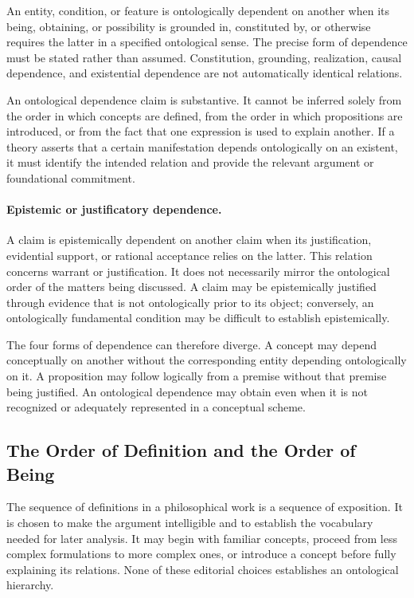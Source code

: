 An entity, condition, or feature is ontologically dependent on another
when its being, obtaining, or possibility is grounded in, constituted
by, or otherwise requires the latter in a specified ontological sense.
The precise form of dependence must be stated rather than assumed.
Constitution, grounding, realization, causal dependence, and
existential dependence are not automatically identical relations.

An ontological dependence claim is substantive. It cannot be inferred
solely from the order in which concepts are defined, from the order in
which propositions are introduced, or from the fact that one
expression is used to explain another. If a theory asserts that a
certain manifestation depends ontologically on an existent, it must
identify the intended relation and provide the relevant argument or
foundational commitment.

\paragraph{Epistemic or justificatory dependence.}

A claim is epistemically dependent on another claim when its
justification, evidential support, or rational acceptance relies on
the latter. This relation concerns warrant or justification. It does
not necessarily mirror the ontological order of the matters being
discussed. A claim may be epistemically justified through evidence
that is not ontologically prior to its object; conversely, an
ontologically fundamental condition may be difficult to establish
epistemically.

The four forms of dependence can therefore diverge. A concept may
depend conceptually on another without the corresponding entity
depending ontologically on it. A proposition may follow logically
from a premise without that premise being justified. An ontological
dependence may obtain even when it is not recognized or adequately
represented in a conceptual scheme.

\subsection{The Order of Definition and the Order of Being}

The sequence of definitions in a philosophical work is a sequence of
exposition. It is chosen to make the argument intelligible and to
establish the vocabulary needed for later analysis. It may begin with
familiar concepts, proceed from less complex formulations to more
complex ones, or introduce a concept before fully explaining its
relations. None of these editorial choices establishes an
ontological hierarchy.

